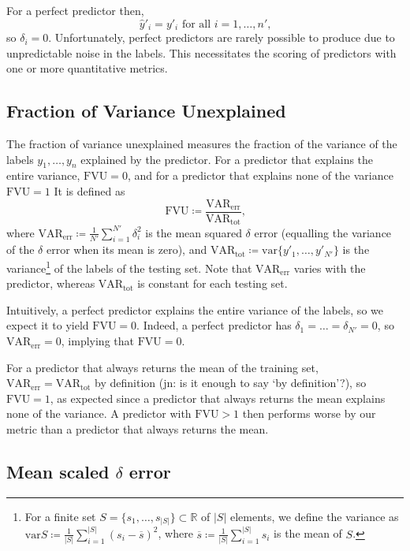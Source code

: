 \documentclass[11pt,twoside]{report}
\newcommand\bbR{\mathbb{R}}
\newcommand\var{\mathrm{var}}
\newcommand\abs[1]{\left|#1\right|}
\newcommand\jn[1]{{\color{red}(jn: #1)}}
\begin{document}
For a perfect predictor then,\[
  \hat y'_i = y'_i \text{ for all }i=1, \dots, n'\text{,}
\] so $\delta_i = 0$. Unfortunately, perfect predictors are rarely possible to produce due to unpredictable noise in the labels. This necessitates the scoring of predictors with one or more quantitative metrics.

\subsection{Fraction of Variance Unexplained}
The fraction of variance unexplained measures the fraction of the variance of the labels $y_1, \dots, y_n$ explained by the predictor. For a predictor that explains the entire variance, $\mathrm{FVU}=0$, and for a predictor that explains none of the variance $\mathrm{FVU}=1$ It is defined as \[
  \mathrm{FVU} \coloneqq \frac{\mathrm{VAR_{err}}}{\mathrm{VAR_{tot}}} \text{,}
\] where $\mathrm{VAR_{err}} \coloneqq \frac{1}{N'}\sum_{i=1}^{N'}\delta_i^2$ is the mean squared $\delta$ error (equalling the variance of the $\delta$ error when its mean is zero), and $\mathrm{VAR_{tot}} \coloneqq \var\{y'_1, \dots, y'_{N'}\}$ is the variance\footnote{For a finite set $S = \{s_1, \dots, s_{\abs{S}}\} \subset \bbR$ of $\abs{S}$ elements, we define the variance as $\var S \coloneqq \frac1{\abs{S}}\sum_{i=1}^{\abs{S}}(s_i - \overline{s})^2$, where $\overline{s} \coloneqq \frac1{\abs{S}}\sum_{i=1}^{\abs{S}}s_i$ is the mean of $S$.} of the labels of the testing set. Note that $\mathrm{VAR_{err}}$ varies with the predictor, whereas $\mathrm{VAR_{tot}}$ is constant for each testing set.

Intuitively, a perfect predictor explains the entire variance of the labels, so we expect it to yield $\mathrm{FVU} = 0$. Indeed, a perfect predictor has $\delta_1 = \dots = \delta_{N'} = 0$, so $\mathrm{VAR_{err}} = 0$, implying that $\mathrm{FVU} = 0$.

For a predictor that always returns the mean of the training set, $\mathrm{VAR_{err}} = \mathrm{VAR_{tot}}$ by definition \jn{is it enough to say `by definition'?}, so $\mathrm{FVU} = 1$, as expected since a predictor that always returns the mean explains none of the variance. A predictor with $\mathrm{FVU} > 1$ then performs worse by our metric than a predictor that always returns the mean.

\subsection{Mean scaled $\delta$ error}
\end{document}
